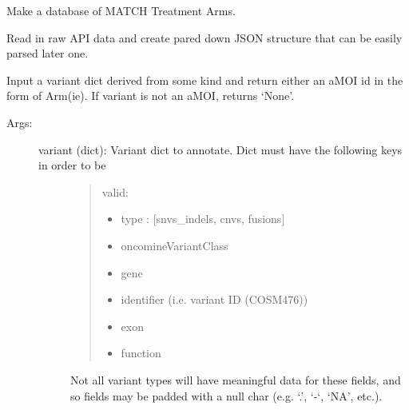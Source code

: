 \documentclass[letterpaper,10pt,english]{sphinxmanual}
\begin{document}
\begin{fulllineitems}
\begin{fulllineitems}
\label{\detokenize{matchbox_api_utils:matchbox_api_utils.TreatmentArms.make_match_arms_db}}
Make a database of MATCH Treatment Arms.

Read in raw API data and create pared down JSON structure that can be easily parsed later one.

\end{fulllineitems}


\begin{fulllineitems}
\label{\detokenize{matchbox_api_utils:matchbox_api_utils.TreatmentArms.map_amoi}}
Input a variant dict derived from some kind and return either an aMOI id in the form of Arm(i\textbar{}e). If
variant is not an aMOI, returns ‘None’.
\begin{description}
\item[{Args:}] \leavevmode\begin{description}
\item[{variant (dict):  Variant dict to annotate.  Dict must have the following keys in order to be}] \leavevmode\begin{quote}

valid:
\begin{itemize}
\item {} 
type : {[}snvs\_indels, cnvs, fusions{]}

\item {} 
oncomineVariantClass

\item {} 
gene

\item {} 
identifier (i.e. variant ID (COSM476))

\item {} 
exon

\item {} 
function

\end{itemize}
\end{quote}

Not all variant types will have meaningful data for these fields, and so fields
may be padded with a null char (e.g. ‘.’, ‘-‘, ‘NA’, etc.).

\end{description}


\end{description}
\end{fulllineitems}
\end{fulllineitems}
\end{document}
